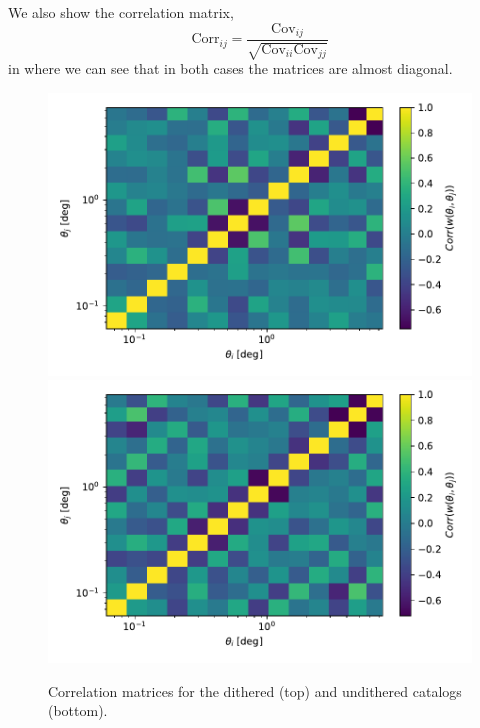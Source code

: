 \documentclass[\docopts]{\docclass}
\begin{document}
We also show the correlation matrix,
\begin{equation}
\mathrm{Corr}_{ij}=\frac{\mathrm{Cov}_{ij}}{\sqrt{\mathrm{Cov}_{ii}\mathrm{Cov}_{jj}}}
\end{equation}
in  where we can see that in both cases the matrices are almost diagonal.
\begin{figure}
\centering
\includegraphics[width=0.9\columnwidth]{correlation_matrix_dithered_25p3.pdf}
\includegraphics[width=0.9\columnwidth]{correlation_matrix_undithered_25p3.pdf}
\caption{Correlation matrices for the dithered (top) and undithered catalogs (bottom).}
\label{fig:2pt_cov}
\end{figure}
\end{document}
